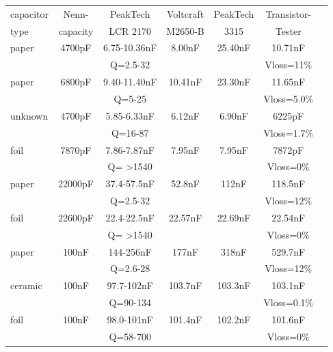\begin{tabular}{| l | c | c | c | c | c | c |}
   \hline
capacitor & Nenn-      & PeakTech      & Voltcraft & PeakTech & Transistor- \\
type        & capacity  & LCR 2170     & M2650-B   &  3315    & Tester      \\
    \hline
    \hline
paper     & 4700pF      & 6.75-10.36nF & 8.00nF    &  25.40nF & 10.71nF  \\
          &             & Q=2.5-32     &           &          & Vloss=11\% \\
    \hline
paper     & 6800pF      & 9.40-11.40nF & 10.41nF   &  23.30nF & 11.65nF \\
          &             & Q=5-25       &           &          & Vloss=5.0\% \\
    \hline
unknown  & 4700pF      & 5.85-6.33nF & 6.12nF    &  6.90nF  & 6225pF \\
           &             & Q=16-87     &           &          & Vloss=1.7\% \\
    \hline
foil      & 7870pF      & 7.86-7.87nF  & 7.95nF    &  7.95nF  & 7872pF \\
          &             & Q= \textgreater 1540     &           &          & Vloss=0\% \\
    \hline
paper     & 22000pF     & 37.4-57.5nF  & 52.8nF    &  112nF   & 118.5nF \\
          &             & Q=2.5-32     &           &          & Vloss=12\% \\
    \hline
foil      & 22600pF     & 22.4-22.5nF  & 22.57nF   & 22.69nF  & 22.54nF \\
          &             & Q= \textgreater 1540     &           &          & Vloss=0\% \\
    \hline
paper     & 100nF       & 144-256nF    & 177nF     &  318nF   & 529.7nF \\
          &             & Q=2.6-28     &           &          & Vloss=12\% \\
    \hline
ceramic   & 100nF       & 97.7-102nF   & 103.7nF   & 103.3nF  & 103.1nF \\
          &             & Q=90-134     &           &          & Vloss=0.1\% \\
    \hline
foil      & 100nF       & 98.0-101nF   & 101.4nF   & 102.2nF  & 101.6nF \\
          &             & Q=58-700     &           &          & Vloss=0\% \\
    \hline
\end{tabular}
\vspace{0.5 cm}

